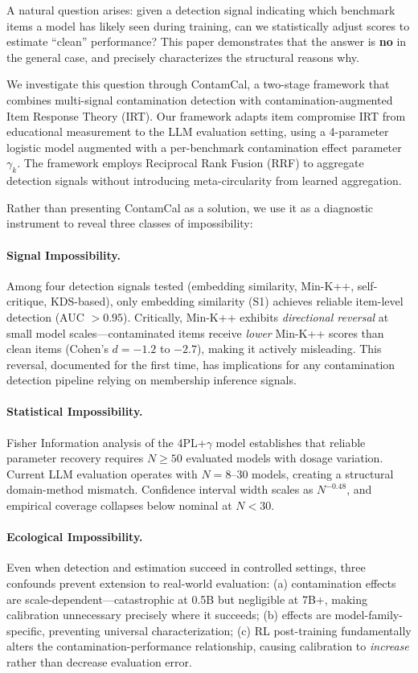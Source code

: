 \documentclass[11pt,a4paper]{article}
\begin{document}
A natural question arises: given a detection signal indicating which benchmark items a model has likely seen during training, can we statistically adjust scores to estimate ``clean'' performance? This paper demonstrates that the answer is \textbf{no} in the general case, and precisely characterizes the structural reasons why.

We investigate this question through ContamCal, a two-stage framework that combines multi-signal contamination detection with contamination-augmented Item Response Theory (IRT). Our framework adapts item compromise IRT from educational measurement \citep{eckerly2017detecting,sinharay2017detection} to the LLM evaluation setting, using a 4-parameter logistic model augmented with a per-benchmark contamination effect parameter $\gamma_k$. The framework employs Reciprocal Rank Fusion (RRF) \citep{cormack2009reciprocal} to aggregate detection signals without introducing meta-circularity from learned aggregation.

Rather than presenting ContamCal as a solution, we use it as a diagnostic instrument to reveal three classes of impossibility:

\paragraph{Signal Impossibility.} Among four detection signals tested (embedding similarity, Min-K++, self-critique, KDS-based), only embedding similarity (S1) achieves reliable item-level detection (AUC $> 0.95$). Critically, Min-K++ exhibits \emph{directional reversal} at small model scales---contaminated items receive \emph{lower} Min-K++ scores than clean items (Cohen's $d = -1.2$ to $-2.7$), making it actively misleading. This reversal, documented for the first time, has implications for any contamination detection pipeline relying on membership inference signals.

\paragraph{Statistical Impossibility.} Fisher Information analysis of the 4PL+$\gamma$ model establishes that reliable parameter recovery requires $N \geq 50$ evaluated models with dosage variation. Current LLM evaluation operates with $N = 8$--$30$ models, creating a structural domain-method mismatch. Confidence interval width scales as $N^{-0.48}$, and empirical coverage collapses below nominal at $N < 30$.

\paragraph{Ecological Impossibility.} Even when detection and estimation succeed in controlled settings, three confounds prevent extension to real-world evaluation: (a) contamination effects are scale-dependent---catastrophic at 0.5B but negligible at 7B+, making calibration unnecessary precisely where it succeeds; (b) effects are model-family-specific, preventing universal characterization; (c) RL post-training fundamentally alters the contamination-performance relationship, causing calibration to \emph{increase} rather than decrease evaluation error.
\end{document}
